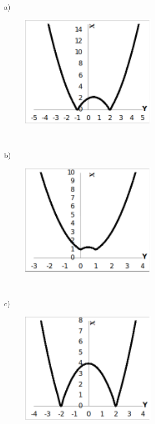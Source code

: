 \begin{respostas}{7}
~~

	\ansitem{} a)


	\begin{figure}[H]
		\begin{Center}
			\includegraphics[width=2.6in,height=2.15in]{capitulos/outras_funcoes/media/image95.pdf}
		\end{Center}
	\end{figure}

~~

	b)

	\begin{figure}[H]
		\begin{Center}
			\includegraphics[width=2.6in,height=2.15in]{capitulos/outras_funcoes/media/image96.pdf}
		\end{Center}
	\end{figure}

~~

	c)

	\begin{figure}[H]
		\begin{Center}
			\includegraphics[width=2.6in,height=2.15in]{capitulos/outras_funcoes/media/image97.pdf}
		\end{Center}
	\end{figure}


\end{respostas}
